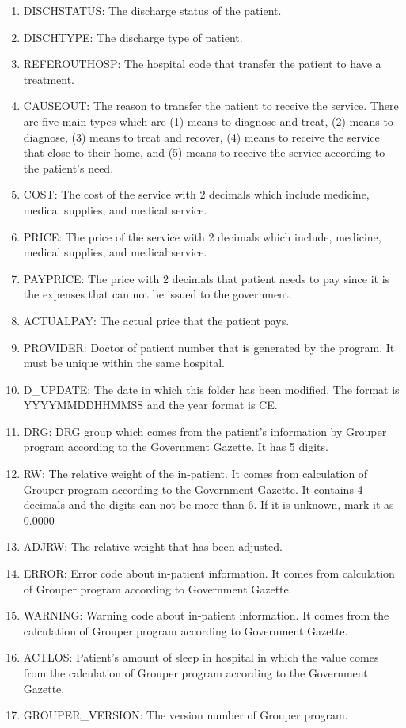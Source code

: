 \begin{enumerate}
  \item DISCHSTATUS: The discharge status of the patient.
  \item DISCHTYPE: The discharge type of patient.
  \item REFEROUTHOSP: The hospital code that transfer the patient to have a treatment.
  \item CAUSEOUT: The reason to transfer the patient to receive the service. There are five main types which are (1) means to diagnose and treat, (2) means to diagnose, (3) means to treat and recover, (4) means to receive the service that close to their home, and (5) means to receive the service according to the patient's need.
  \item COST: The cost of the service with 2 decimals which include medicine, medical supplies, and medical service.
  \item PRICE: The price of the service with 2 decimals which include, medicine, medical supplies, and medical service.
  \item PAYPRICE: The price with 2 decimals that patient needs to pay since it is the expenses that can not be issued to the government.
  \item ACTUALPAY: The actual price that the patient pays.
  \item PROVIDER: Doctor of patient number that is generated by the program. It must be unique within the same hospital.
  \item D\_UPDATE: The date in which this folder has been modified. The format is YYYYMMDDHHMMSS and the year format is CE.
  \item DRG: DRG group which comes from the patient's information by Grouper program according to the Government Gazette. It has 5 digits.
  \item RW: The relative weight of the in-patient. It comes from calculation of Grouper program according to the Government Gazette. It contains 4 decimals and the digits can not be more than 6. If it is unknown, mark it as 0.0000
  \item ADJRW: The relative weight that has been adjusted.
  \item ERROR: Error code about in-patient information. It comes from calculation of Grouper program according to Government Gazette.
  \item WARNING: Warning code about in-patient information. It comes from the calculation of Grouper program according to Government Gazette.
  \item ACTLOS: Patient's amount of sleep in hospital in which the value comes from the calculation of Grouper program according to the Government Gazette.
  \item GROUPER\_VERSION: The version number of Grouper program.
\end{enumerate}
